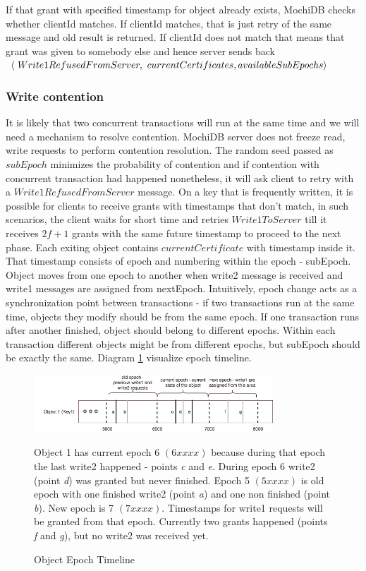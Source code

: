 \documentclass[letterpaper,twocolumn,10pt]{article}
\begin{document}
If that grant with specified timestamp for object already exists, MochiDB checks whether clientId matches. If clientId matches, that is just retry of the same message and old result is returned. If clientId does not match that means that grant was given to somebody else and hence server sends back
$\langle\ Write1RefusedFromServer,\ currentCertificates,\\ availableSubEpochs\rangle$


\subsubsection{Write contention} \label{write_contension}
It is likely that two concurrent transactions will run at the same time and we will need a mechanism to resolve contention. MochiDB server does not freeze read, write requests to perform contention resolution. The random seed passed as $subEpoch$ minimizes the probability of contention and if contention with concurrent transaction had happened nonetheless, it will ask client to retry with a $Write1RefusedFromServer$ message. On a key that is frequently written, it is possible for clients to receive grants with timestamps that don't match, in such scenarios, the client waits for short time and retries $Write1ToServer$ till it receives $2f+1$ grants with the same future timestamp to proceed to the next phase.
Each exiting object contains $currentCertificate$ with timestamp inside it. That timestamp consists of epoch and numbering within the epoch - subEpoch. Object moves from one epoch to another when write2 message is received and write1 messages are assigned from nextEpoch. Intuitively, epoch change acts as a synchronization point between transactions - if two transactions run at the same time, objects they modify should be from the same epoch. If one transaction runs after another finished, object should belong to different epochs. Within each transaction different objects might be from different epochs, but subEpoch should be exactly the same. Diagram \ref{fig:epochs_view} visualize epoch timeline. 

\begin{figure}
\includegraphics[width=0.8\textwidth]{Epochs.png}
\label{fig:epochs_view}
\caption{Object Epoch Timeline}
\small Object 1 has current epoch 6 $\left(6xxxx\right)$ because during that epoch the last write2 happened - points \textit{c} and \textit{e}. During epoch 6 write2 (point \textit{d}) was granted but never finished. Epoch 5 $\left(5xxxx\right)$ is old epoch with one finished write2 (point \textit{a}) and one non finished (point \textit{b}). New epoch is 7 $\left(7xxxx\right)$. Timestamps for write1 requests will be granted from that epoch. Currently two grants happened (points \textit{f} and \textit{g}), but no write2 was received yet.
\centering
\end{figure}
\end{document}
